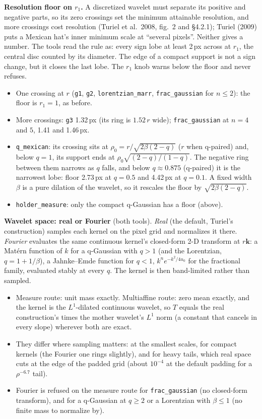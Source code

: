\documentclass[10pt]{article}
\newcommand{\dev}[1]{\texttt{#1}}
\begin{document}
\textbf{Resolution floor on $r_1$.} A discretized wavelet must separate its positive and
negative parts, so its zero crossings set the minimum attainable resolution, and more crossings
cost resolution (Turiel et al.\ 2008, fig.~2 and \S4.2.1); Turiel (2009) puts a Mexican hat's
inner minimum scale at ``several pixels''. Neither gives a number. The tools read the rule as:
every sign lobe at least 2\,px across at $r_1$, the central disc counted by its diameter. The
edge of a compact support is not a sign change, but it closes the last lobe. The $r_1$ knob
warns below the floor and never refuses.
\begin{itemize}\itemsep2pt
  \item One crossing at $r$ (\texttt{g1}, \texttt{g2}, \texttt{lorentzian\_marr},
        \texttt{frac\_gaussian} for $n\le2$): the floor is $r_1=1$, as before.
  \item More crossings: \texttt{g3} 1.32\,px (its ring is $1.52\,r$ wide); \texttt{frac\_gaussian}
        at $n=4$ and $5$, 1.41 and 1.46\,px.
  \item \texttt{q\_mexican}: its crossing sits at $\rho_0=r/\sqrt{2\beta(2-q)}$ ($r$ when q-paired)
        and, below $q=1$, its support ends at $\rho_0\sqrt{(2-q)/(1-q)}$. The negative ring between
        them narrows as $q$ falls, and below $q\approx0.875$ (q-paired) it is the narrowest lobe:
        floor 2.73\,px at $q=0.5$ and 4.42\,px at $q=0.1$. A fixed width $\beta$ is a pure
        dilation of the wavelet, so it rescales the floor by $\sqrt{2\beta(2-q)}$.
  \item \dev{holder\_measure}: only the compact q-Gaussian has a floor (above).
\end{itemize}

\textbf{Wavelet space: real or Fourier} (both tools). \emph{Real} (the default, Turiel's
construction) samples each kernel on the pixel grid and normalizes it there. \emph{Fourier}
evaluates the same continuous kernel's closed-form 2-D transform at $r\mathbf{k}$: a Mat\'ern
function of $k$ for a q-Gaussian with $q>1$ (and the Lorentzian, $q=1+1/\beta$), a Jahnke--Emde
function for $q<1$, $k^n e^{-k^2/4u_0}$ for the fractional family, evaluated stably at every
$q$. The kernel is then band-limited rather than sampled.
\begin{itemize}\itemsep2pt
  \item Measure route: unit mass exactly. Multiaffine route: zero mean exactly, and the kernel
        is the $L^1$-dilated continuous wavelet, so $T$ equals the real construction's times the
        mother wavelet's $L^1$ norm (a constant that cancels in every slope) wherever both are
        exact.
  \item They differ where sampling matters: at the smallest scales, for compact kernels (the
        Fourier one rings slightly), and for heavy tails, which real space cuts at the edge of the
        padded grid (about $10^{-4}$ at the default padding for a $\rho^{-6.7}$ tail).
  \item Fourier is refused on the measure route for \texttt{frac\_gaussian} (no closed-form
        transform), and for a q-Gaussian at $q\ge2$ or a Lorentzian with $\beta\le1$ (no finite
        mass to normalize by).
\end{itemize}
\end{document}
